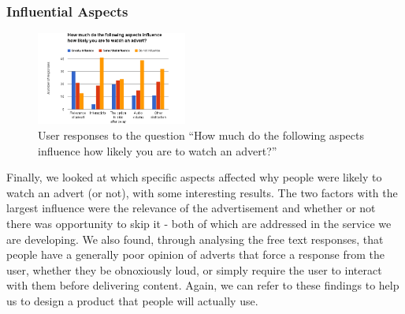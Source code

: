 \subsubsection{Influential Aspects}
\begin{figure}
	\vspace{-10pt}
	\includegraphics[width=0.44\textwidth]{images/prestudy_influence.png}
	\caption{User responses to the question ``How much do the following aspects influence how likely you are to watch an advert?''}
	\label{fig:prestudy_influence}
	\vspace{-15pt}
\end{figure}
Finally, we looked at which specific aspects affected why people were likely to watch an advert (or not), with some interesting results. The two factors with the largest influence were the relevance of the advertisement and whether or not there was opportunity to skip it - both of which are addressed in the service we are developing. We also found, through analysing the free text responses, that people have a generally poor opinion of adverts that force a response from the user, whether they be obnoxiously loud, or simply require the user to interact with them before delivering content. Again, we can refer to these findings to help us to design a product that people will actually use. 


